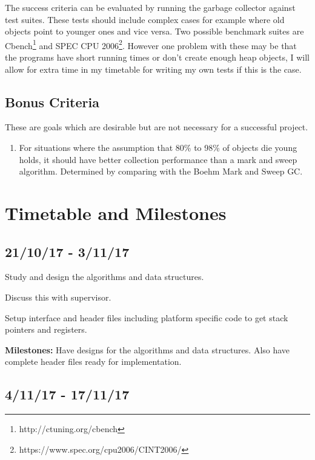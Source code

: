 \documentclass[12pt, a4]{article}
\begin{document}
The success criteria can be evaluated by running the garbage collector against test suites. These tests should include complex cases for example where old objects point to younger ones and vice versa. Two possible benchmark suites are Cbench\footnote{http://ctuning.org/cbench} and SPEC CPU 2006\footnote{https://www.spec.org/cpu2006/CINT2006/}. However one problem with these may be that the programs have short running times or don't create enough heap objects, I will allow for extra time in my timetable for writing my own tests if this is the case.

\subsection*{Bonus Criteria}

These are goals which are desirable but are not necessary for a successful project.

\begin{enumerate}

\item For situations where the assumption that 80\% to 98\% of objects die young holds, it should have better collection performance than a mark and sweep algorithm. Determined by comparing with the Boehm Mark and Sweep GC.

\end{enumerate}

\section*{Timetable and Milestones}

\subsection*{21/10/17 - 3/11/17}

Study and design the algorithms and data structures.

Discuss this with supervisor.

Setup interface and header files including platform specific code to get stack pointers and registers.

{\bf Milestones:} Have designs for the algorithms and data structures. Also have complete header files ready for implementation.

\subsection*{4/11/17 - 17/11/17}
\end{document}
